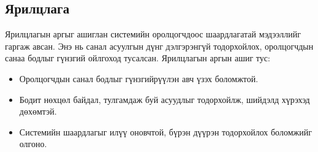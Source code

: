 \subsection{Ярилцлага}
Ярилцлагын аргыг ашиглан системийн оролцогчдоос шаардлагатай мэдээллийг гаргаж авсан. Энэ нь санал асуулгын дүнг дэлгэрэнгүй тодорхойлох, оролцогчдын санаа бодлыг гүнзгий ойлгоход тусалсан. Ярилцлагын аргын ашиг тус:
\begin{itemize}
    \item Оролцогчдын санал бодлыг гүнзгийрүүлэн авч үзэх боломжтой.
    \item Бодит нөхцөл байдал, тулгамдаж буй асуудлыг тодорхойлж, шийдэлд хүрэхэд дөхөмтэй.
    \item Системийн шаардлагыг илүү оновчтой, бүрэн дүүрэн тодорхойлох боломжийг олгоно.
\end{itemize}



